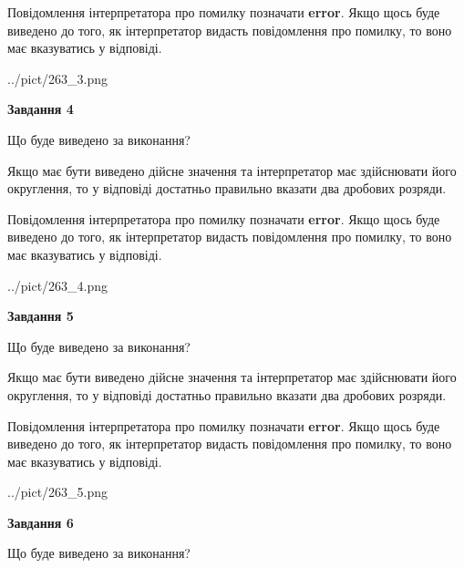 \documentclass[12pt, ukrainian]{article}
\begin{document}
{\begin {Large}
Повідомлення інтерпретатора про помилку позначати \textbf{error}.
Якщо щось буде виведено до того, як інтерпретатор видасть повідомлення про помилку, 
то воно має вказуватись у відповіді. \par

\begin{center}
	{../pict/263_3.png}
\end{center}
\newpage

{\begin {center}\textbf{Завдання 4}\end {center}}\par
Що буде виведено за виконання? \par

Якщо має бути виведено дійсне значення та інтерпретатор має здійснювати його округлення, 
то у відповіді достатньо правильно вказати два дробових розряди.

Повідомлення інтерпретатора про помилку позначати \textbf{error}.
Якщо щось буде виведено до того, як інтерпретатор видасть повідомлення про помилку, 
то воно має вказуватись у відповіді. \par

\begin{center}
	{../pict/263_4.png}
\end{center}
\newpage

{\begin {center}\textbf{Завдання 5}\end {center}}\par
Що буде виведено за виконання? \par

Якщо має бути виведено дійсне значення та інтерпретатор має здійснювати його округлення, 
то у відповіді достатньо правильно вказати два дробових розряди.

Повідомлення інтерпретатора про помилку позначати \textbf{error}.
Якщо щось буде виведено до того, як інтерпретатор видасть повідомлення про помилку, 
то воно має вказуватись у відповіді. \par

\begin{center}
	{../pict/263_5.png}
\end{center}
\newpage

{\begin {center}\textbf{Завдання 6}\end {center}}\par
Що буде виведено за виконання? \par


\end{Large}}
\end{document}
